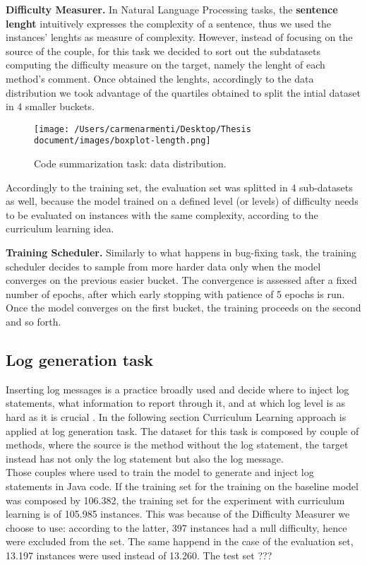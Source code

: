 \noindent\textbf{Difficulty Measurer.} In Natural Language Processing tasks, the \textbf{sentence lenght} intuitively expresses the complexity 
of a sentence, thus we used the instances' lenghts as measure of complexity. 
However, instead of focusing on the source of the couple, for this task we decided to sort out the subdatasets computing the
difficulty measure on the target, namely the lenght of each method's comment. 
Once obtained the lenghts, accordingly to the data distribution we took advantage of the quartiles obtained to split the intial dataset in 4 smaller 
buckets. 
\begin{figure}[h!]
    \begin{center}
        \texttt{[image: /Users/carmenarmenti/Desktop/Thesis document/images/boxplot-length.png]}
        \caption{\label{fig:CSdistribution}Code summarization task: data distribution.}
    \end{center}
\end{figure}
Accordingly to the training set, the evaluation set was splitted in 4 sub-datasets as well, because the model trained on a defined level (or levels) of difficulty
needs to be evaluated on instances with the same complexity, according to the curriculum learning idea.\newline

\noindent\textbf{Training Scheduler.} Similarly to what happens in bug-fixing task, the training scheduler decides to sample from more harder data only when the model converges on the 
previous easier bucket. The convergence is assessed after a fixed number of epochs, after which early stopping with patience of 5 epochs
is run. Once the model converges on the first bucket, the training proceeds on the second and so forth. 

\subsection{Log generation task}
Inserting log messages is a practice broadly used and decide where to inject log statements, what information to report through it, 
and at which log level is as hard as it is crucial \cite{Mastropaolo2022}. In the following section Curriculum Learning approach 
is applied at log generation task. The dataset for this task is composed by couple of methods, where the source is the method without the log statement,
the target instead has not only the log statement but also the log message.\\
Those couples where used to train the model to generate and inject log statements in Java code.
If the training set for the training on the baseline model was composed by 106.382, the training set for the experiment with curriculum learning 
is of 105.985 instances. This was because of the Difficulty Measurer we choose to use: according to the latter, 397 instances had a null difficulty, hence
were excluded from the set. The same happend in the case of the evaluation set, 13.197 instances were used instead of 13.260. 
The test set ??? \newline


